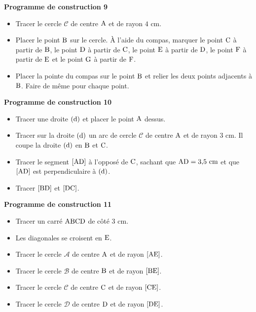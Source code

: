 \documentclass{article}
\begin{document}
\noindent\textbf{Programme de construction 9}\par\smallskip\noindent
\begin{itemize}
    \item Tracer le cercle $\mathcal{C}$ de centre $\text{A}$ et de
    rayon $4\text{ cm}$.
    \item Placer le point $\text{B}$ sur le cercle. À l'aide du
    compas, marquer le point $\text{C}$ à partir de
    $\text{B}$, le point $\text{D}$ à partir de
    $\text{C}$, le point $\text{E}$ à partir de
    $\text{D}$, le point $\text{F}$ à partir de
    $\text{E}$ et le point $\text{G}$ à partir de
    $\text{F}$.
    \item Placer la pointe du compas sur le point $\text{B}$ et
    relier les deux points adjacents à $\text{B}$. Faire de même pour
    chaque point.
\end{itemize}
\noindent\textbf{Programme de construction 10}\par\smallskip\noindent
\begin{itemize}
    \item Tracer une droite $(\text{d})$ et placer le point
    $\text{A}$ dessus.
    \item Tracer sur la droite $(\text{d})$ un arc de cercle
    $\mathcal{C}$ de centre $\text{A}$ et de rayon $3\text{ cm}$. Il
    coupe la droite $(\text{d})$ en $\text{B}$ et
    $\text{C}$.
    \item Tracer le segment $[\text{AD}]$ à l'opposé de
    $\text{C}$, sachant que $\text{AD}=3{,}5\text{ cm}$ et que
    $[\text{AD}]$ est perpendiculaire à $(\text{d})$.
    \item Tracer $[\text{BD}]$ et $[\text{DC}]$.
\end{itemize}
\noindent\textbf{Programme de construction 11}\par\smallskip\noindent
\begin{itemize}
    \item Tracer un carré $\text{ABCD}$ de côté $3\text{ cm}$.
    \item Les diagonales se croisent en $\text{E}$.
    \item Tracer le cercle $\mathcal{A}$ de centre $\text{A}$ et de
    rayon $[\text{AE}]$.
    \item Tracer le cercle $\mathcal{B}$ de centre $\text{B}$ et de
    rayon $[\text{BE}]$.
    \item Tracer le cercle $\mathcal{C}$ de centre $\text{C}$ et de
    rayon $[\text{CE}]$.
    \item Tracer le cercle $\mathcal{D}$ de centre $\text{D}$ et de
    rayon $[\text{DE}]$.
\end{itemize}
\end{document}
